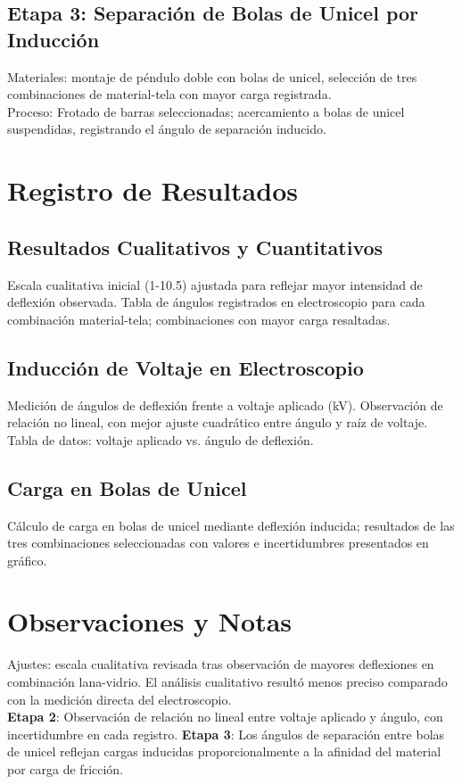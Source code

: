 \documentclass[article,12pt]{elsarticle}
\begin{document}
\subsection{Etapa 3: Separación de Bolas de Unicel por Inducción}
Materiales: montaje de péndulo doble con bolas de unicel, selección de tres combinaciones de material-tela con mayor carga registrada. \\
Proceso: Frotado de barras seleccionadas; acercamiento a bolas de unicel suspendidas, registrando el ángulo de separación inducido.

\section{Registro de Resultados}
\subsection{Resultados Cualitativos y Cuantitativos}
Escala cualitativa inicial (1-10.5) ajustada para reflejar mayor intensidad de deflexión observada. Tabla de ángulos registrados en electroscopio para cada combinación material-tela; combinaciones con mayor carga resaltadas.

\subsection{Inducción de Voltaje en Electroscopio}
Medición de ángulos de deflexión frente a voltaje aplicado (kV). Observación de relación no lineal, con mejor ajuste cuadrático entre ángulo y raíz de voltaje. \\
Tabla de datos: voltaje aplicado vs. ángulo de deflexión.

\subsection{Carga en Bolas de Unicel}
Cálculo de carga en bolas de unicel mediante deflexión inducida; resultados de las tres combinaciones seleccionadas con valores e incertidumbres presentados en gráfico.

\section{Observaciones y Notas}
Ajustes: escala cualitativa revisada tras observación de mayores deflexiones en combinación lana-vidrio. El análisis cualitativo resultó menos preciso comparado con la medición directa del electroscopio. \\
\textbf{Etapa 2}: Observación de relación no lineal entre voltaje aplicado y ángulo, con incertidumbre en cada registro.
\textbf{Etapa 3}: Los ángulos de separación entre bolas de unicel reflejan cargas inducidas proporcionalmente a la afinidad del material por carga de fricción.
\end{document}
